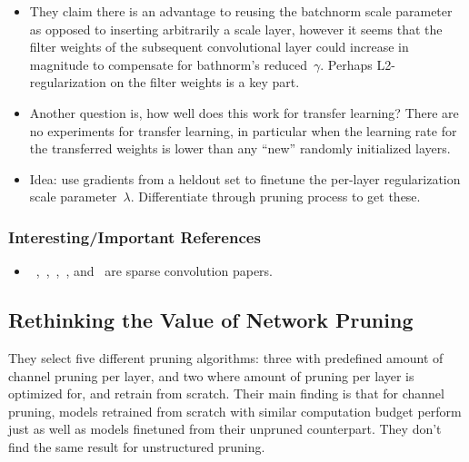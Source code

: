 \documentclass[a4paper, 12pt]{article}
\begin{document}
\begin{itemize}
        \item They claim there is an advantage to reusing the batchnorm scale
                parameter as opposed to inserting arbitrarily a scale layer,
                however it seems that the filter weights of the subsequent
                convolutional layer could increase in magnitude to compensate
                for bathnorm's reduced~$\gamma$. Perhaps L2-regularization on
                the filter weights is a key part.

        \item Another question is, how well does this work for transfer
                learning? There are no experiments for transfer learning, in
                particular when the learning rate for the transferred weights
                is lower than any ``new'' randomly initialized layers.

        \item Idea: use gradients from a heldout set to finetune the per-layer
                regularization scale parameter~$\lambda$. Differentiate through
                pruning process to get these.
\end{itemize}


\subsubsection{Interesting/Important References}

\begin{itemize}
        \item~\cite{changpinyo2017thepower},~\cite{liu2015sparse},~\cite{scardapane2016group},~\cite{wen2016learning},
                and~\cite{zhou2016less} are sparse convolution papers.
\end{itemize}


\subsection{Rethinking the Value of Network Pruning~\cite{liu2018rethinking}}

They select five different pruning algorithms: three with predefined amount of
channel pruning per layer, and two where amount of pruning per layer is
optimized for, and retrain from scratch. Their main finding is that for channel
pruning, models retrained from scratch with similar computation budget perform
just as well as models finetuned from their unpruned counterpart. They don't
find the same result for unstructured pruning.
\end{document}
